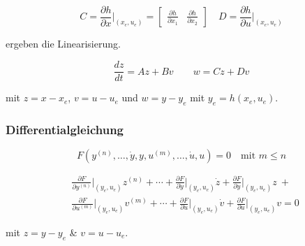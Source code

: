 \documentclass[
  10pt,
  a4paper,
  twocolumn]{article}
\numberwithin{equation}{section}
\begin{document}
\[
C=\frac{\partial h}{\partial x}\biggr\rvert_{(x_e,u_e)}=\begin{bmatrix}
\frac{\partial h}{\partial x_1} & \frac{\partial h}{\partial x_2}
\end{bmatrix}
\quad D=\frac{\partial h}{\partial u}\biggr\rvert_{(x_e,u_e)}
\]

ergeben die Linearisierung.

\[
\frac{dz}{dt}=Az+Bv\qquad w=Cz+Dv
\]

mit \(z=x-x_e\), \(v=u-u_e\) und \(w=y-y_e\) mit \(y_e=h(x_e,u_e)\).

\subsubsection{Differentialgleichung}\label{differentialgleichung}

\[
F(y^{(n)},\ldots,\dot{y},y,u^{(m)},\ldots,\dot{u},u)=0\quad\text{mit } m\leq n
\]

\[
\begin{split} 
&\frac{\partial{F}}{\partial{y^{(n)}}}\biggr\rvert_{(y_e,u_e)} z^{(n)}+ 
 \cdots+ 
 \frac{\partial{F}}{\partial{\dot{y}}}\biggr\rvert_{(y_e,u_e)} \dot{z}+ 
 \frac{\partial{F}}{\partial{y}}\biggr\rvert_{(y_e,u_e)} z\ + \\
&\frac{\partial{F}}{\partial{u^{(m)}}}\biggr\rvert_{(y_e,u_e)} v^{(m)}+
 \cdots+ 
 \frac{\partial{F}}{\partial{\dot{u}}}\biggr\rvert_{(y_e,u_e)} \dot{v}+
 \frac{\partial{F}}{\partial{u}}\biggr\rvert_{(y_e,u_e)} v = 0 
\end{split}
\]

mit \(z=y-y_e\) \& \(v=u-u_e\).
\end{document}
